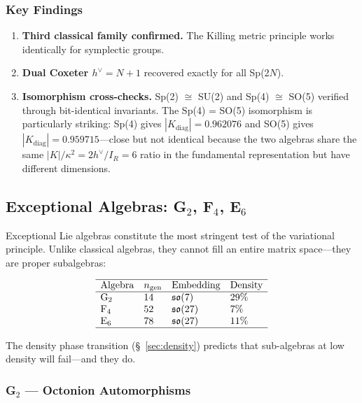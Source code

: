 \subsubsection{Key Findings}

\begin{enumerate}[label=\arabic*.]
\item \textbf{Third classical family confirmed.} The Killing metric principle works identically for symplectic groups.

\item \textbf{Dual Coxeter $h^\vee = N+1$} recovered exactly for all Sp(2$N$).

\item \textbf{Isomorphism cross-checks.} Sp(2) $\cong$ SU(2) and Sp(4) $\cong$ SO(5) verified through bit-identical invariants. The Sp(4) = SO(5) isomorphism is particularly striking: Sp(4) gives $|K_{\mathrm{diag}}| = 0.962076$ and SO(5) gives $|K_{\mathrm{diag}}| = 0.959715$---close but not identical because the two algebras share the same $|K|/\kappa^2 = 2h^\vee/I_R = 6$ ratio in the fundamental representation but have different dimensions.
\end{enumerate}

\subsection{Exceptional Algebras: G$_2$, F$_4$, E$_6$}\label{sec:exceptional}

Exceptional Lie algebras constitute the most stringent test of the variational principle. Unlike classical algebras, they cannot fill an entire matrix space---they are proper subalgebras:

\begin{equation}
\begin{array}{llll}
\hline
\text{Algebra} & n_{\mathrm{gen}} & \text{Embedding} & \text{Density} \\
\hline
\text{G}_2 & 14 & \mathfrak{so}(7) & 29\% \\
\text{F}_4 & 52 & \mathfrak{so}(27) & 7\% \\
\text{E}_6 & 78 & \mathfrak{so}(27) & 11\% \\
\hline
\end{array}
\end{equation}

The density phase transition (§~\ref{sec:density}) predicts that sub-algebras at low density will fail---and they do.

\subsubsection{G$_2$ --- Octonion Automorphisms}

